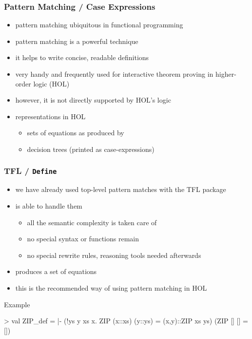 \begin{frame}
\frametitle{Pattern Matching / Case Expressions}

\begin{itemize}
\item pattern matching ubiquitous in functional programming
\item pattern matching is a powerful technique
\item it helps to write concise, readable definitions
\item very handy and frequently used for interactive theorem proving in higher-order logic (HOL)
\item however, it is \alert{not directly supported} by HOL's logic
\item representations in HOL
\begin{itemize}
\item sets of equations as produced by 
\item decision trees (printed as case-expressions)
\end{itemize}
\end{itemize}
\end{frame}


\begin{frame}[fragile]
\frametitle{TFL / \texttt{Define}}

\begin{itemize}
\item we have already used top-level pattern matches with the TFL package
\item {} is able to handle them
\begin{itemize}
\item all the semantic complexity is taken care of
\item no special syntax or functions remain
\item no special rewrite rules, reasoning tools needed afterwards
\end{itemize}
\item {} produces a set of equations
\item this is the recommended way of using pattern matching in HOL
\end{itemize}

\begin{exampleblock}{Example}
\begin{semiverbatim}\scriptsize
> 
val ZIP_def = |- (!ys y xs x. ZIP (x::xs) (y::ys) = (x,y)::ZIP xs ys) \holAnd{}
                 (ZIP [] [] = [])
\end{semiverbatim}
\end{exampleblock}
\end{frame}


